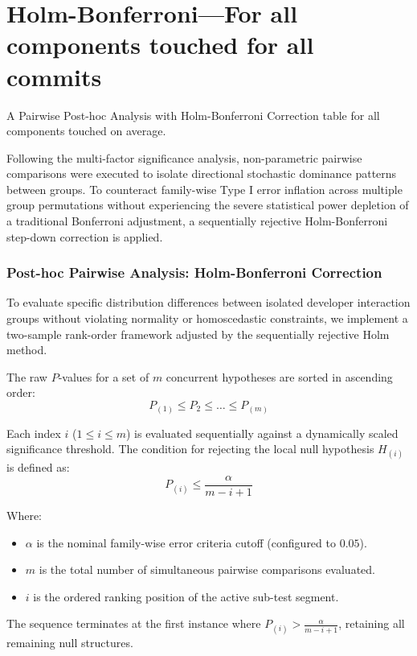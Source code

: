 \section{Holm-Bonferroni---For all components touched for all commits} 
\label{sec:codebase_graph_latex.repository_graph.component_time_series.holm_bonferroni} 
A Pairwise Post-hoc Analysis with Holm-Bonferroni Correction table for all components touched on average. 

Following the multi-factor significance analysis, non-parametric pairwise comparisons 
were executed to isolate directional stochastic dominance patterns between groups. 
To counteract family-wise Type I error inflation across multiple group permutations 
without experiencing the severe statistical power depletion of a traditional 
Bonferroni adjustment, a sequentially rejective Holm-Bonferroni step-down 
correction is applied.



\subsubsection*{Post-hoc Pairwise Analysis: Holm-Bonferroni Correction}
To evaluate specific distribution differences between isolated developer interaction 
groups without violating normality or homoscedastic constraints, we implement a 
two-sample rank-order framework adjusted by the sequentially rejective Holm method.

The raw $P$-values for a set of $m$ concurrent hypotheses are sorted in ascending 
order:
\begin{equation}
    P_{(1)} \le P_{2} \le \dots \le P_{(m)}
\end{equation}

Each index $i$ ($1 \le i \le m$) is evaluated sequentially against a dynamically 
scaled significance threshold. The condition for rejecting the local null hypothesis 
$H_{(i)}$ is defined as:
\begin{equation}
    P_{(i)} \le \frac{\alpha}{m - i + 1}
\end{equation}

Where:
\begin{itemize}
    \item $\alpha$ is the nominal family-wise error criteria cutoff (configured to $0.05$).
    \item $m$ is the total number of simultaneous pairwise comparisons evaluated.
    \item $i$ is the ordered ranking position of the active sub-test segment.
\end{itemize}
The sequence terminates at the first instance where $P_{(i)} > \frac{\alpha}{m - i + 1}$, 
retaining all remaining null structures.

\newpage 
